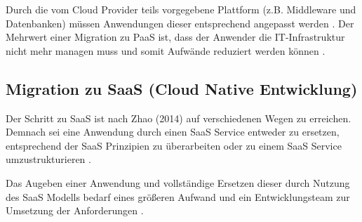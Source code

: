 Durch die vom Cloud Provider teils vorgegebene Plattform (z.B. Middleware und Datenbanken) müssen Anwendungen dieser entsprechend angepasst werden \cite[Vgl.][S. 227]{Surianarayanan2019}. Der Mehrwert einer Migration zu \ac{PaaS} ist, dass der Anwender die IT-Infrastruktur nicht mehr managen muss und somit Aufwände reduziert werden können \cite[Vgl.][S. 6]{Pahl}.

\subsection{Migration zu SaaS (Cloud Native Entwicklung)}
Der Schritt zu \ac{SaaS} ist nach Zhao (2014) auf verschiedenen Wegen zu erreichen. Demnach sei eine Anwendung durch einen SaaS Service entweder zu ersetzen, entsprechend der SaaS Prinzipien zu überarbeiten oder zu einem \ac{SaaS} Service umzustrukturieren \cite[Vgl.][S. 144]{Zhao2014}.

Das Augeben einer Anwendung und vollständige Ersetzen dieser durch Nutzung des \ac{SaaS} Modells bedarf eines größeren Aufwand und ein Entwicklungsteam zur Umsetzung der Anforderungen \cite[Vgl.][]{CIO}.